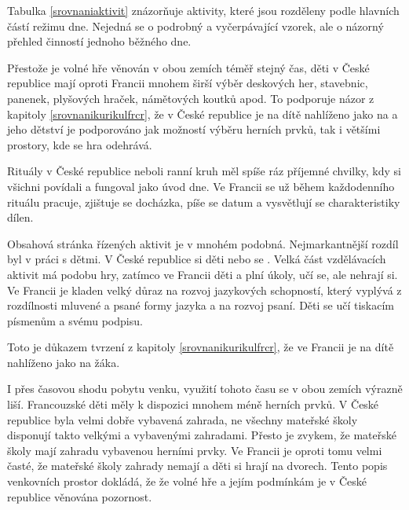 	Tabulka \ref{srovnaniaktivit} znázorňuje aktivity, které jsou rozděleny podle hlavních částí režimu dne. Nejedná se o podrobný a vyčerpávající vzorek, ale o názorný přehled činností jednoho běžného dne. 

	Přestože je volné hře věnován v obou zemích téměř stejný čas, děti v České republice mají oproti Francii mnohem širší výběr deskových her, stavebnic, panenek, plyšových hraček, námětových koutků apod. To podporuje názor z kapitoly \ref{srovnanikurikulfrcr}, že v České republice je na dítě nahlíženo jako na  a jeho dětství je podporováno jak možností výběru herních prvků, tak i většími prostory, kde se hra odehrává. 

	Rituály v České republice neboli ranní kruh měl spíše ráz příjemné chvilky, kdy si všichni povídali a fungoval jako úvod dne. Ve Francii se už během každodenního rituálu pracuje, zjištuje se docházka, píše se datum a vysvětlují se charakteristiky dílen.

	Obsahová stránka řízených aktivit je v mnohém podobná. Nejmarkantnější rozdíl byl v práci s dětmi. V České republice si děti  nebo se . Velká část vzdělávacích aktivit má podobu hry, zatímco ve Francii děti  a plní úkoly, učí se, ale nehrají si. Ve Francii je kladen velký důraz na rozvoj jazykových schopností, který vyplývá z rozdílnosti mluvené a psané formy jazyka a na rozvoj psaní. Děti se učí tiskacím písmenům a svému podpisu.

	Toto je důkazem tvrzení z kapitoly \ref{srovnanikurikulfrcr}, že ve Francii je na dítě nahlíženo jako na žáka.

	I přes časovou shodu pobytu venku, využití tohoto času se v obou zemích výrazně liší. Francouzské děti měly k dispozici mnohem méně herních prvků. V České republice byla velmi dobře vybavená zahrada, ne všechny mateřské školy disponují takto velkými a vybavenými zahradami. Přesto je zvykem, že mateřské školy mají zahradu vybavenou herními prvky. Ve Francii je oproti tomu velmi časté, že mateřské školy zahrady nemají a děti si hrají na dvorech. Tento popis venkovních prostor dokládá, že že volné hře a jejím podmínkám je v České republice věnována pozornost.



		
	


